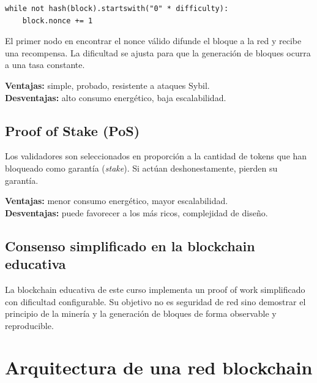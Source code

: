 \documentclass[
  coursetitle={Cómputo Nube y Tecnologías Emergentes},
  coursehours={96},
  coursedate={Verano 2026},
  doctype={Notas de clase},
  otherlangs={english,french},
  authorname={Lázaro},
  authorsurname={Bustio-Martínez},
  authortitle={PhD},
  role={Profesor Investigador},
  email={lbustio@inaoe.mx},
  phone={5559504000},
  ext={7459},
  institution={Instituto Nacional de Astrofísica, Óptica y Electrónica (INAOE)},
  department={Maestría en Ciencias en Tecnologías de Seguridad},
  address={Luis Enrique Erro 1, Sta. Ma. Tonantzintla, San Andrés Cholula, CP 72840, Puebla, México},
  margin={0.5in}
]{../../lbustio_lecture_notes}
\begin{document}
\begin{lstlisting}
while not hash(block).startswith("0" * difficulty):
    block.nonce += 1
\end{lstlisting}

El primer nodo en encontrar el nonce válido difunde el bloque a la red y recibe una recompensa. La dificultad se ajusta para que la generación de bloques ocurra a una tasa constante.

\textbf{Ventajas:} simple, probado, resistente a ataques Sybil.\\
\textbf{Desventajas:} alto consumo energético, baja escalabilidad.

\subsection{Proof of Stake (PoS)}

Los validadores son seleccionados en proporción a la cantidad de tokens que han bloqueado como garantía (\textit{stake}). Si actúan deshonestamente, pierden su garantía.

\textbf{Ventajas:} menor consumo energético, mayor escalabilidad.\\
\textbf{Desventajas:} puede favorecer a los más ricos, complejidad de diseño.

\subsection{Consenso simplificado en la blockchain educativa}

La blockchain educativa de este curso implementa un proof of work simplificado con dificultad configurable. Su objetivo no es seguridad de red sino demostrar el principio de la minería y la generación de bloques de forma observable y reproducible.

\section{Arquitectura de una red blockchain}
\end{document}
